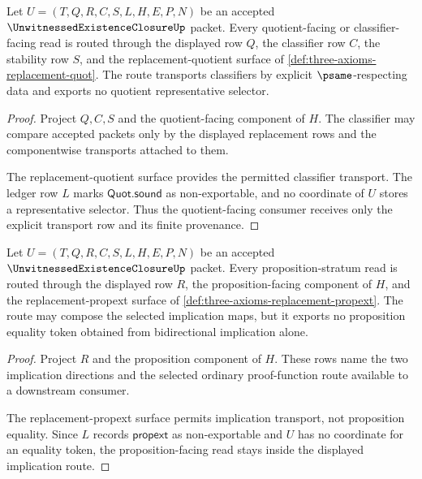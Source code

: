 \begin{theorem}
\label{thm:unwitnessed-existence-closure-quotient-replacement-route}
Let $U=(T,Q,R,C,S,L,H,E,P,N)$ be an accepted $\UnwitnessedExistenceClosureUp$ packet. Every quotient-facing or classifier-facing read is routed through the displayed row $Q$, the classifier row $C$, the stability row $S$, and the replacement-quotient surface of \autoref{def:three-axioms-replacement-quot}. The route transports classifiers by explicit $\psame$-respecting data and exports no quotient representative selector.
\end{theorem}
\begin{proof}
Project $Q,C,S$ and the quotient-facing component of $H$. The classifier may compare accepted packets only by the displayed replacement rows and the componentwise transports attached to them.

The replacement-quotient surface provides the permitted classifier transport. The ledger row $L$ marks $\mathsf{Quot.sound}$ as non-exportable, and no coordinate of $U$ stores a representative selector. Thus the quotient-facing consumer receives only the explicit transport row and its finite provenance.
\end{proof}

\begin{theorem}
\label{thm:unwitnessed-existence-closure-proposition-replacement-route}
Let $U=(T,Q,R,C,S,L,H,E,P,N)$ be an accepted $\UnwitnessedExistenceClosureUp$ packet. Every proposition-stratum read is routed through the displayed row $R$, the proposition-facing component of $H$, and the replacement-propext surface of \autoref{def:three-axioms-replacement-propext}. The route may compose the selected implication maps, but it exports no proposition equality token obtained from bidirectional implication alone.
\end{theorem}
\begin{proof}
Project $R$ and the proposition component of $H$. These rows name the two implication directions and the selected ordinary proof-function route available to a downstream consumer.

The replacement-propext surface permits implication transport, not proposition equality. Since $L$ records $\mathsf{propext}$ as non-exportable and $U$ has no coordinate for an equality token, the proposition-facing read stays inside the displayed implication route.
\end{proof}

